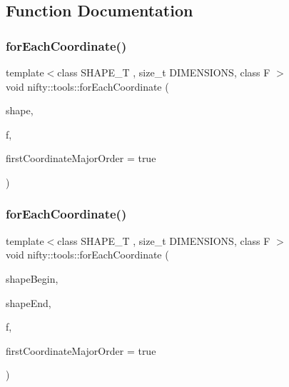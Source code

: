 \subsection{Function Documentation}
\mbox{\label{namespacenifty_1_1tools_a81df2669bba7acc0ad9a253669a28ba4}} 
\subsubsection{\texorpdfstring{for\+Each\+Coordinate()}{forEachCoordinate()}\hspace{0.1cm}{\footnotesize\ttfamily [1/2]}}
{\footnotesize\ttfamily template$<$class S\+H\+A\+P\+E\+\_\+T , size\+\_\+t D\+I\+M\+E\+N\+S\+I\+O\+NS, class F $>$ \\
void nifty\+::tools\+::for\+Each\+Coordinate (\begin{DoxyParamCaption}\item[{const \hyperlink{namespacenifty_1_1array_a683f151f19c851754e0c6d55ed16a0c2}{array\+::\+Static\+Array}$<$ S\+H\+A\+P\+E\+\_\+T, D\+I\+M\+E\+N\+S\+I\+O\+NS $>$ \&}]{shape,  }\item[{F \&\&}]{f,  }\item[{bool}]{first\+Coordinate\+Major\+Order = {\ttfamily true} }\end{DoxyParamCaption})}

\mbox{\label{namespacenifty_1_1tools_a757aec65ec994397f40a807952edd219}} 
\subsubsection{\texorpdfstring{for\+Each\+Coordinate()}{forEachCoordinate()}\hspace{0.1cm}{\footnotesize\ttfamily [2/2]}}
{\footnotesize\ttfamily template$<$class S\+H\+A\+P\+E\+\_\+T , size\+\_\+t D\+I\+M\+E\+N\+S\+I\+O\+NS, class F $>$ \\
void nifty\+::tools\+::for\+Each\+Coordinate (\begin{DoxyParamCaption}\item[{const \hyperlink{namespacenifty_1_1array_a683f151f19c851754e0c6d55ed16a0c2}{array\+::\+Static\+Array}$<$ S\+H\+A\+P\+E\+\_\+T, D\+I\+M\+E\+N\+S\+I\+O\+NS $>$ \&}]{shape\+Begin,  }\item[{const \hyperlink{namespacenifty_1_1array_a683f151f19c851754e0c6d55ed16a0c2}{array\+::\+Static\+Array}$<$ S\+H\+A\+P\+E\+\_\+T, D\+I\+M\+E\+N\+S\+I\+O\+NS $>$ \&}]{shape\+End,  }\item[{F \&\&}]{f,  }\item[{bool}]{first\+Coordinate\+Major\+Order = {\ttfamily true} }\end{DoxyParamCaption})}

